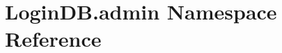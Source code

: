 \hypertarget{namespace_login_d_b_1_1admin}{}\section{Login\+D\+B.\+admin Namespace Reference}
\label{namespace_login_d_b_1_1admin}
